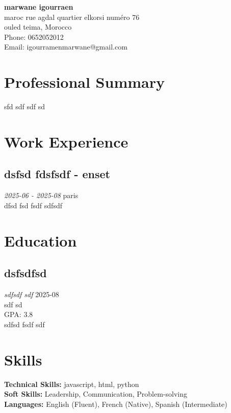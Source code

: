 \documentclass[11pt,a4paper]{article}
\begin{document}
\begin{center}
{\LARGE \textbf{marwane igourraen}}\\[0.5em]
maroc rue agdal quartier elkorsi numéro 76\\
ouled teima, Morocco\\
Phone: 0652052012\\
Email: igourramenmarwane@gmail.com\\



\end{center}


\section{Professional Summary}
sfd sdf sdf sd



\section{Work Experience}

\subsection{dsfsd fdsfsdf  - enset}
\textit{2025-06 - 2025-08} \hfill paris\\
dfsd fsd fsdf sdfsdf \\




\section{Education}

\subsection{dsfsdfsd}
\textit{sdfsdf sdf} \hfill 2025-08\\
sdf sd\\
GPA: 3.8\\
sdfsd fsdf sdf \\




\section{Skills}
\textbf{Technical Skills:} javascript, html, python\\
\textbf{Soft Skills:} Leadership, Communication, Problem-solving\\
\textbf{Languages:} English (Fluent), French (Native), Spanish (Intermediate)\\




\end{document}
